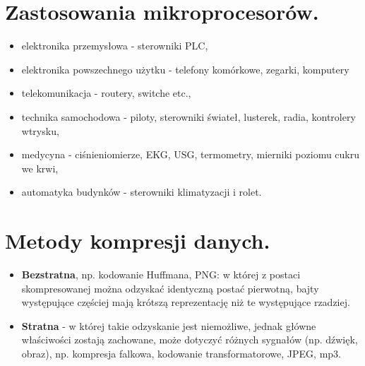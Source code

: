 \documentclass[12pt,a4paper]{article}
\begin{document}
	\section{Zastosowania mikroprocesorów.}
	\begin{itemize}
		\item elektronika przemysłowa - sterowniki PLC,
		\item elektronika powszechnego użytku - telefony komórkowe, zegarki, komputery
		\item telekomunikacja - routery, switche etc.,
		\item technika samochodowa - piloty, sterowniki świateł, lusterek, radia, kontrolery wtrysku,
		\item medycyna - ciśnieniomierze, EKG, USG, termometry, mierniki poziomu cukru we krwi,
		\item automatyka budynków - sterowniki klimatyzacji i rolet.
	\end{itemize}

	\section{Metody kompresji danych.}
	\begin{itemize}
		\item \textbf{Bezstratna}, np. kodowanie Huffmana, PNG: w której z postaci skompresowanej można odzyskać identyczną postać pierwotną, bajty występujące częściej mają krótszą reprezentację niż te występujące rzadziej. 
		\item \textbf{Stratna} - w której takie odzyskanie jest niemożliwe, jednak główne właściwości zostają zachowane, może dotyczyć różnych sygnałów (np. dźwięk, obraz), np. kompresja falkowa, kodowanie transformatorowe, JPEG, mp3.
	\end{itemize}
\end{document}
